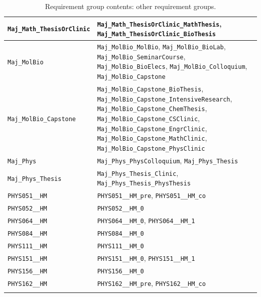 \begin{longtable}{|p{4.4in}|p{4.4in}|}
    \verb|Maj_Math_ThesisOrClinic| & \verb|Maj_Math_ThesisOrClinic_MathThesis|, \verb|Maj_Math_ThesisOrClinic_BioThesis|\\\hline
    \verb|Maj_MolBio| & \verb|Maj_MolBio_MolBio|, \verb|Maj_MolBio_BioLab|, \verb|Maj_MolBio_SeminarCourse|, \verb|Maj_MolBio_BioElecs|, \verb|Maj_MolBio_Colloquium|, \verb|Maj_MolBio_Capstone|\\\hline
    \verb|Maj_MolBio_Capstone| & \verb|Maj_MolBio_Capstone_BioThesis|, \verb|Maj_MolBio_Capstone_IntensiveResearch|, \verb|Maj_MolBio_Capstone_ChemThesis|, \verb|Maj_MolBio_Capstone_CSClinic|, \verb|Maj_MolBio_Capstone_EngrClinic|, \verb|Maj_MolBio_Capstone_MathClinic|, \verb|Maj_MolBio_Capstone_PhysClinic|\\\hline
    \verb|Maj_Phys| & \verb|Maj_Phys_PhysColloquium|, \verb|Maj_Phys_Thesis|\\\hline
    \verb|Maj_Phys_Thesis| & \verb|Maj_Phys_Thesis_Clinic|, \verb|Maj_Phys_Thesis_PhysThesis|\\\hline
    \verb|PHYS051__HM| & \verb|PHYS051__HM_pre|, \verb|PHYS051__HM_co|\\\hline
    \verb|PHYS052__HM| & \verb|PHYS052__HM_0|\\\hline
    \verb|PHYS064__HM| & \verb|PHYS064__HM_0|, \verb|PHYS064__HM_1|\\\hline
    \verb|PHYS084__HM| & \verb|PHYS084__HM_0|\\\hline
    \verb|PHYS111__HM| & \verb|PHYS111__HM_0|\\\hline
    \verb|PHYS151__HM| & \verb|PHYS151__HM_0|, \verb|PHYS151__HM_1|\\\hline
    \verb|PHYS156__HM| & \verb|PHYS156__HM_0|\\\hline
    \verb|PHYS162__HM| & \verb|PHYS162__HM_pre|, \verb|PHYS162__HM_co|\\\hline
    \caption{Requirement group contents: other requirement groups.}
    \label{tab:reqs-groups}
\end{longtable}
